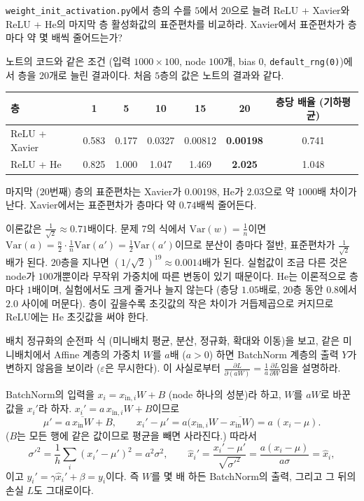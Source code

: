 \documentclass[11pt,a4paper]{article}
\newcommand{\pd}[2]{\frac{\partial #1}{\partial #2}}
\begin{document}
\begin{problems}
\item \texttt{weight\_init\_activation.py}에서 층의 수를 $5$에서 $20$으로 늘려
ReLU + Xavier와 ReLU + He의 마지막 층 활성화값의 표준편차를 비교하라.
Xavier에서 표준편차가 층마다 약 몇 배씩 줄어드는가?

\begin{sol}
노트의 코드와 같은 조건 (입력 $1000\times100$, node $100$개, bias $0$, \texttt{default\_rng(0)})에서 층을 $20$개로 늘린 결과이다.
처음 $5$층의 값은 노트의 결과와 같다.
\begin{center}
\begin{tabular}{lcccccc}
\toprule
층 & 1 & 5 & 10 & 15 & 20 & 층당 배율 (기하평균) \\
\midrule
ReLU + Xavier & 0.583 & 0.177 & 0.0327 & 0.00812 & \textbf{0.00198} & 0.741 \\
ReLU + He     & 0.825 & 1.000 & 1.047 & 1.469 & \textbf{2.025} & 1.048 \\
\bottomrule
\end{tabular}
\end{center}
마지막 ($20$번째) 층의 표준편차는 Xavier가 $0.00198$, He가 $2.03$으로 약 $1000$배 차이가 난다.
Xavier에서는 표준편차가 층마다 약 $\boxed{0.74\text{배}}$씩 줄어든다.

이론값은 $\frac{1}{\sqrt2}\approx0.71$배이다.
문제 7의 식에서 $\mathrm{Var}(w)=\frac1n$이면 $\mathrm{Var}(a)=\frac n2\cdot\frac1n\mathrm{Var}(a')=\frac12\mathrm{Var}(a')$이므로
분산이 층마다 절반, 표준편차가 $\frac1{\sqrt2}$배가 된다. $20$층을 지나면 $(1/\sqrt2)^{19}\approx0.0014$배가 된다.
실험값이 조금 다른 것은 node가 $100$개뿐이라 무작위 가중치에 따른 변동이 있기 때문이다.
He는 이론적으로 층마다 $1$배이며, 실험에서도 크게 줄거나 늘지 않는다
(층당 $1.05$배로, $20$층 동안 $0.8$에서 $2.0$ 사이에 머문다).
층이 깊을수록 초깃값의 작은 차이가 거듭제곱으로 커지므로 ReLU에는 He 초깃값을 써야 한다.
\end{sol}

\item 배치 정규화의 순전파 식 (미니배치 평균, 분산, 정규화, 확대와 이동)을 보고,
같은 미니배치에서 Affine 계층의 가중치 $W$를 $a$배 ($a>0$) 하면 BatchNorm 계층의 출력 $Y$가 변하지 않음을 보이라
($\varepsilon$은 무시한다). 이 사실로부터 $\pd{L}{(aW)}=\frac1a\pd{L}{W}$임을 설명하라.

\begin{sol}
BatchNorm의 입력을 $x_i=x_{\text{in},i}W+B$ (node 하나의 성분)라 하고, $W$를 $aW$로 바꾼 값을 $x_i'$라 하자.
$x_i'=a\,x_{\text{in},i}W+B$이므로
\[
\mu'=a\,\overline{x_{\text{in}}W}+B,\qquad
x_i'-\mu'=a\bigl(x_{\text{in},i}W-\overline{x_{\text{in}}W}\bigr)=a\,(x_i-\mu).
\]
($B$는 모든 행에 같은 값이므로 평균을 빼면 사라진다.) 따라서
\[
\sigma'^2=\frac1h\sum_i(x_i'-\mu')^2=a^2\sigma^2,\qquad
\hat x_i'=\frac{x_i'-\mu'}{\sqrt{\sigma'^2}}=\frac{a(x_i-\mu)}{a\sigma}=\hat x_i,
\]
이고 $y_i'=\gamma\hat x_i'+\beta=y_i$이다. 즉 $W$를 몇 배 하든 BatchNorm의 출력, 그리고 그 뒤의 손실 $L$도 그대로이다.


\end{sol}
\end{problems}
\end{document}
